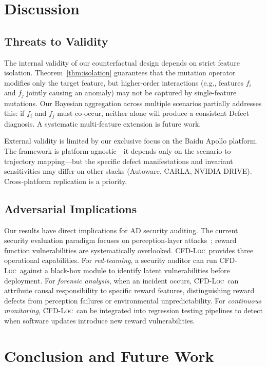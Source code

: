 \documentclass[journal]{IEEEtran}
\theoremstyle{plain}
\newcommand{\methodname}{\textsc{CFD-Loc}}
\begin{document}
\section{Discussion}

\subsection{Threats to Validity}

The internal validity of our counterfactual design depends on strict feature isolation. Theorem~\ref{thm:isolation} guarantees that the mutation operator modifies only the target feature, but higher-order interactions (e.g., features $f_i$ and $f_j$ jointly causing an anomaly) may not be captured by single-feature mutations. Our Bayesian aggregation across multiple scenarios partially addresses this: if $f_i$ and $f_j$ must co-occur, neither alone will produce a consistent Defect diagnosis. A systematic multi-feature extension is future work.

External validity is limited by our exclusive focus on the Baidu Apollo platform. The framework is platform-agnostic---it depends only on the scenario-to-trajectory mapping---but the specific defect manifestations and invariant sensitivities may differ on other stacks (Autoware, CARLA, NVIDIA DRIVE). Cross-platform replication is a priority.

\subsection{Adversarial Implications}

Our results have direct implications for AD security auditing. The current security evaluation paradigm focuses on perception-layer attacks~\cite{goodfellow2015explaining}; reward function vulnerabilities are systematically overlooked. \methodname\ provides three operational capabilities. For \emph{red-teaming}, a security auditor can run \methodname\ against a black-box module to identify latent vulnerabilities before deployment. For \emph{forensic analysis}, when an incident occurs, \methodname\ can attribute causal responsibility to specific reward features, distinguishing reward defects from perception failures or environmental unpredictability. For \emph{continuous monitoring}, \methodname\ can be integrated into regression testing pipelines to detect when software updates introduce new reward vulnerabilities.

\section{Conclusion and Future Work}
\end{document}
